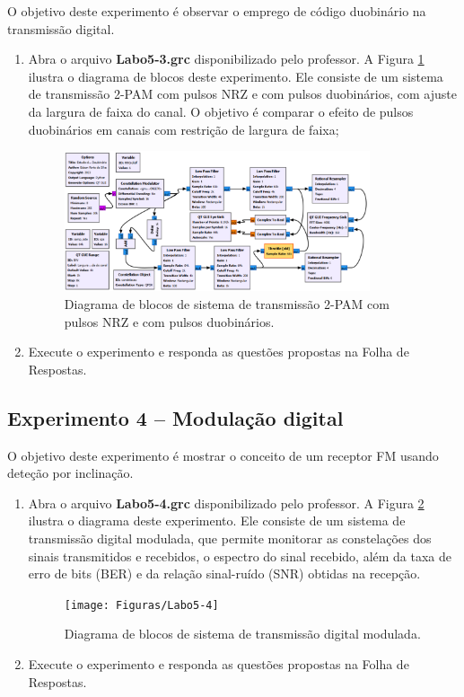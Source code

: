 \documentclass[12pt,addpoints]{exam}
\begin{document}
O objetivo deste experimento é observar o emprego de código duobinário na transmissão digital.
\begin{enumerate}
    \item Abra o arquivo \textbf{Labo5-3.grc} disponibilizado pelo professor. A Figura \ref{fig:GRC_5-3} ilustra o diagrama de blocos deste experimento. Ele consiste de um sistema de transmissão 2-PAM com pulsos NRZ e com pulsos duobinários, com ajuste da largura de faixa do canal. O objetivo é comparar o efeito de pulsos duobinários em canais com restrição de largura de faixa;
    \begin{figure}[htb]
        \centering
        \includegraphics[width=0.85\textwidth]{Figuras/Labo5-3}
        \caption{Diagrama de blocos de sistema de transmissão 2-PAM com pulsos NRZ e com pulsos duobinários.} 
        \label{fig:GRC_5-3}
    \end{figure}
  \item Execute o experimento e responda as questões propostas na Folha de Respostas.
\end{enumerate}

 \subsection{Experimento 4 -- Modulação digital}

O objetivo deste experimento é mostrar o conceito de um receptor FM usando deteção por inclinação.
 \begin{enumerate}
     \item  Abra o arquivo \textbf{Labo5-4.grc} disponibilizado pelo professor. A Figura \ref{fig:GRC_5-4} ilustra o diagrama deste experimento. Ele consiste de um sistema de transmissão digital modulada, que permite monitorar as constelações dos sinais transmitidos e recebidos, o espectro do sinal recebido, além da taxa de erro de bits (BER) e da relação sinal-ruído (SNR) obtidas na recepção.
     \begin{figure}[htb]
         \centering
         \texttt{[image: Figuras/Labo5-4]}
         \caption{Diagrama de blocos de sistema de transmissão digital modulada.} 
         \label{fig:GRC_5-4}
     \end{figure}
   \item Execute o experimento e responda as questões propostas na Folha de Respostas.
\end{enumerate}
\end{document}
